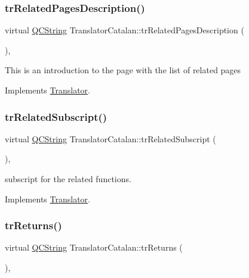 \subsubsection{\texorpdfstring{trRelatedPagesDescription()}{trRelatedPagesDescription()}}
{\footnotesize\ttfamily virtual \mbox{\hyperlink{class_q_c_string}{Q\+C\+String}} Translator\+Catalan\+::tr\+Related\+Pages\+Description (\begin{DoxyParamCaption}{ }\end{DoxyParamCaption})\hspace{0.3cm}{\ttfamily [inline]}, {\ttfamily [virtual]}}

This is an introduction to the page with the list of related pages 

Implements \mbox{\hyperlink{class_translator}{Translator}}.

\mbox{\label{class_translator_catalan_a74eaf438b0f84919715636ebeeda04f2}} 
\subsubsection{\texorpdfstring{trRelatedSubscript()}{trRelatedSubscript()}}
{\footnotesize\ttfamily virtual \mbox{\hyperlink{class_q_c_string}{Q\+C\+String}} Translator\+Catalan\+::tr\+Related\+Subscript (\begin{DoxyParamCaption}{ }\end{DoxyParamCaption})\hspace{0.3cm}{\ttfamily [inline]}, {\ttfamily [virtual]}}

subscript for the related functions. 

Implements \mbox{\hyperlink{class_translator}{Translator}}.

\mbox{\label{class_translator_catalan_ad454e3b9f6c040b58cb6731d23774f7e}} 
\subsubsection{\texorpdfstring{trReturns()}{trReturns()}}
{\footnotesize\ttfamily virtual \mbox{\hyperlink{class_q_c_string}{Q\+C\+String}} Translator\+Catalan\+::tr\+Returns (\begin{DoxyParamCaption}{ }\end{DoxyParamCaption})\hspace{0.3cm}{\ttfamily [inline]}, {\ttfamily [virtual]}}

